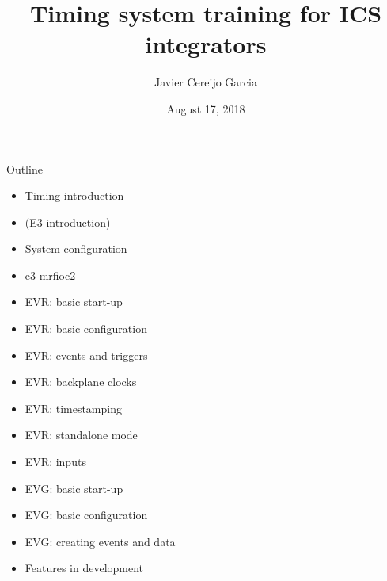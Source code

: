 \documentclass[
  9pt
  , table
  , ignorenonframetext
]{beamer}
\title{Timing system training for ICS integrators}
\author{Javier Cereijo Garcia}%
\institute{
  Integrated Control System Division\\
  \textbf{ESS}, Sweden
}
\date{August 17, 2018}
\begin{document}
\begin{frame}[plain]
  \titlepage
\end{frame}


\begin{frame}{Outline}
    \begin{itemize}
    \item Timing introduction
    \item (E3 introduction)
    \item System configuration
    \item e3-mrfioc2
    \item EVR: basic start-up
    \item EVR: basic configuration
    \item EVR: events and triggers
    \item EVR: backplane clocks
    \item EVR: timestamping
    \item EVR: standalone mode
    \item EVR: inputs
    \item EVG: basic start-up
    \item EVG: basic configuration
    \item EVG: creating events and data
    \item Features in development
    \end{itemize}
\end{frame}
\end{document}
